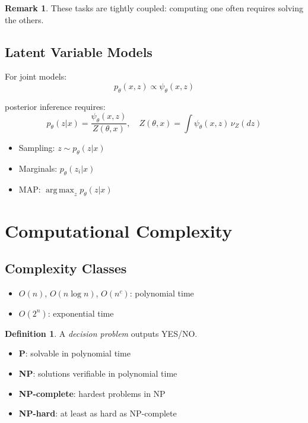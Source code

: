 \documentclass[12pt,oneside]{book}
\numberwithin{equation}{section}
\theoremstyle{definition}
\newtheorem{definition}{Definition}[section]
\newtheorem{remark}{Remark}[section]
\theoremstyle{plain}
\theoremstyle{remark}
\newcommand{\argmax}{\operatorname*{arg\,max}}
\begin{document}
\begin{remark}
These tasks are tightly coupled: computing one often requires solving the others.
\end{remark}


\subsection*{Latent Variable Models}

For joint models:
\[
p_\theta(x,z) \propto \psi_\theta(x,z)
\]

posterior inference requires:
\[
p_\theta(z|x) = \frac{\psi_\theta(x,z)}{Z(\theta,x)}, \quad
Z(\theta,x) = \int \psi_\theta(x,z)\,\nu_Z(dz)
\]

\begin{itemize}
\item Sampling: $z \sim p_\theta(z|x)$
\item Marginals: $p_\theta(z_i|x)$
\item MAP: $\argmax_z p_\theta(z|x)$
\end{itemize}


\section{Computational Complexity}

\subsection*{Complexity Classes}

\begin{itemize}
\item $O(n)$, $O(n\log n)$, $O(n^c)$: polynomial time
\item $O(2^n)$: exponential time
\end{itemize}

\begin{definition}
A \emph{decision problem} outputs YES/NO.

\begin{itemize}
\item \textbf{P}: solvable in polynomial time
\item \textbf{NP}: solutions verifiable in polynomial time
\item \textbf{NP-complete}: hardest problems in NP
\item \textbf{NP-hard}: at least as hard as NP-complete
\end{itemize}
\end{definition}
\end{document}
